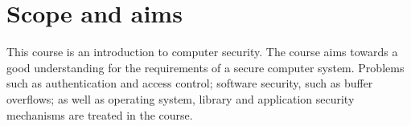 \mode*

\section{Scope and aims}%
\label{sec:aim}


This course is an introduction to computer security.
The course aims towards a good understanding for the requirements of a secure 
computer system.
Problems such as authentication and access control; software security, such as 
buffer overflows; as well as operating system, library and application security 
mechanisms are treated in the course.


